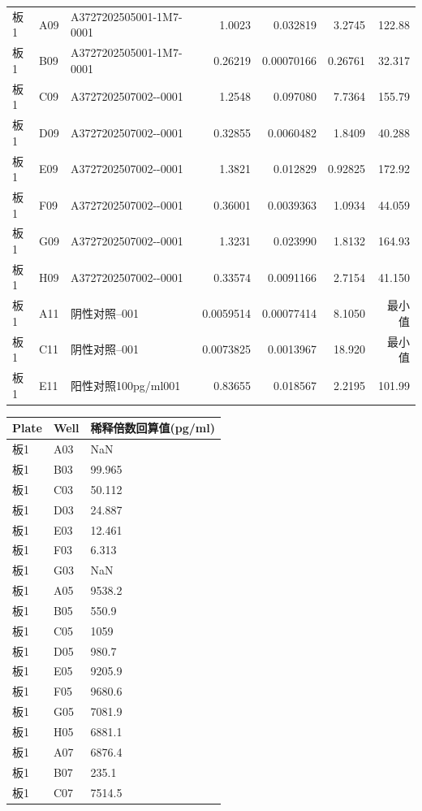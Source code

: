 \documentclass[UTF8,10pt,a4paper,fontset=fandol]{ctexart}
\begin{document}
\begin{tabularx}{\textwidth}{@{}llXrrrr@{}}
板1 & A09 & A3727202505001-\newline 1M7-0001 & 1.0023 & 0.032819 & 3.2745 & 122.88 \\
板1 & B09 & A3727202505001-\newline 1M7-0001 & 0.26219 & 0.00070166 & 0.26761 & 32.317 \\
板1 & C09 & A3727202507002-\newline 1-0001 & 1.2548 & 0.097080 & 7.7364 & 155.79 \\
板1 & D09 & A3727202507002-\newline 1-0001 & 0.32855 & 0.0060482 & 1.8409 & 40.288 \\
板1 & E09 & A3727202507002-\newline 2-0001 & 1.3821 & 0.012829 & 0.92825 & 172.92 \\
板1 & F09 & A3727202507002-\newline 2-0001 & 0.36001 & 0.0039363 & 1.0934 & 44.059 \\
板1 & G09 & A3727202507002-\newline 3-0001 & 1.3231 & 0.023990 & 1.8132 & 164.93 \\
板1 & H09 & A3727202507002-\newline 3-0001 & 0.33574 & 0.0091166 & 2.7154 & 41.150 \\
板1 & A11 & 阴性对照--001 & 0.0059514 & 0.00077414 & 8.1050 & 最小值 \\
板1 & C11 & 阴性对照--001 & 0.0073825 & 0.0013967 & 18.920 & 最小值 \\
板1 & E11 & 阳性对照100pg/ml001 & 0.83655 & 0.018567 & 2.2195 & 101.99 \\
\end{tabularx}

\vspace{1em}

\begin{tabularx}{\textwidth}{@{}llX@{}}
\textbf{Plate} & \textbf{Well} & \textbf{稀释倍数回算值(pg/ml)} \\ \hline
板1 & A03 & NaN \\
板1 & B03 & 99.965 \\
板1 & C03 & 50.112 \\
板1 & D03 & 24.887 \\
板1 & E03 & 12.461 \\
板1 & F03 & 6.313 \\
板1 & G03 & NaN \\
板1 & A05 & 9538.2 \\
板1 & B05 & 550.9 \\
板1 & C05 & 1059 \\
板1 & D05 & 980.7 \\
板1 & E05 & 9205.9 \\
板1 & F05 & 9680.6 \\
板1 & G05 & 7081.9 \\
板1 & H05 & 6881.1 \\
板1 & A07 & 6876.4 \\
板1 & B07 & 235.1 \\
板1 & C07 & 7514.5 \\
\end{tabularx}
\end{document}

